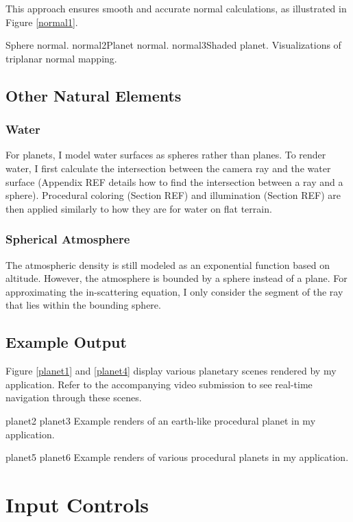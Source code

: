 This approach ensures smooth and accurate normal calculations, as illustrated in Figure \ref{normal1}.

{Sphere normal.}
{normal2}{Planet normal.}
{normal3}{Shaded planet.}
{Visualizations of triplanar normal mapping.}

\subsection{Other Natural Elements}

\subsubsection{Water}

For planets, I model water surfaces as spheres rather than planes. To render water, I first calculate the intersection between the camera ray and the water surface (Appendix REF details how to find the intersection between a ray and a sphere). Procedural coloring (Section REF) and illumination (Section REF) are then applied similarly to how they are for water on flat terrain.

\subsubsection{Spherical Atmosphere}

The atmospheric density is still modeled as an exponential function based on altitude. However, the atmosphere is bounded by a sphere instead of a plane. For approximating the in-scattering equation, I only consider the segment of the ray that lies within the bounding sphere.

\subsection{Example Output}

Figure \ref{planet1} and \ref{planet4} display various planetary scenes rendered by my application. Refer to the accompanying video submission to see real-time navigation through these scenes.

{planet2}{}
{planet3}{}
{Example renders of an earth-like procedural planet in my application.}

{planet5}{}
{planet6}{}
{Example renders of various procedural planets in my application.}

\section{Input Controls}

